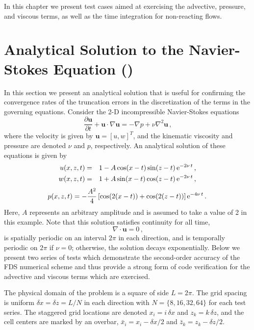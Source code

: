 \documentclass[11pt]{book}
\begin{document}
In this chapter we present test cases aimed at exercising the advective, pressure, and viscous terms, as well as the time integration for non-reacting flows.


\section{Analytical Solution to the Navier-Stokes Equation (\texorpdfstring{}{ns2d})}
\label{ns2d}
\label{ns2d_64_nupt1}

In this section we present an analytical solution that is useful for confirming the convergence rates of the truncation errors in the discretization of the terms in
the governing equations. Consider the 2-D incompressible Navier-Stokes equations
\begin{equation}
\label{eqn_NS}
\frac{\partial \mathbf{u}}{\partial t} + \mathbf{u} \cdot \nabla \mathbf{u} = - \nabla{p} + \nu \nabla^2 \mathbf{u} \,\mbox{,}
\end{equation}
where the velocity is given by $\mathbf{u} = [u, w]^T$, and the kinematic viscosity and pressure are denoted $\nu$ and $p$, respectively.
An analytical solution of these equations is given by \cite{McDermott:NS2D}
\begin{eqnarray}
\label{eqn_usoln}
u(x,z,t) &=& 1 - A\cos(x-t)\sin(z-t)\,{\rm e}^{-2\nu\, t} \,\mbox{,} \\
w(x,z,t) &=& 1 + A\sin(x-t)\cos(z-t)\,{\rm e}^{-2\nu\, t} \,\mbox{,}
\end{eqnarray}
\begin{equation}
p(x,z,t) = -\frac{A^2}{4} \left[ \cos(2(x-t))+\cos(2(z-t))\right]{\rm e}^{-4\nu\, t} \,\mbox{.}
\end{equation}
Here, $A$ represents an arbitrary amplitude and is assumed to take a value of 2 in this example.
Note that this solution satisfies continuity for all time,
\begin{equation}
\label{eqn_divfree}
\nabla\cdot\mathbf{u} = 0 \,\mbox{,}
\end{equation}
is spatially periodic on an interval $2\pi$ in each direction, and is temporally periodic on $2\pi$ if $\nu=0$; otherwise, the solution decays exponentially.
Below we present two series of tests which demonstrate the second-order accuracy of the FDS numerical scheme and thus provide a strong form of code verification
for the advective and viscous terms which are exercised.

The physical domain of the problem is a square of side $L=2\pi$.  The grid spacing is uniform $\delta x = \delta z = L/N$ in each direction
with $N =\{8,16,32,64\}$ for each test series.  The staggered grid locations are denoted $x_i = i \, \delta x$ and $z_k = k \, \delta z$, and the cell
centers are marked by an overbar, $\bar{x}_i = x_i - \delta x/2$ and $\bar{z}_k = z_k - \delta z/2$.
\end{document}
